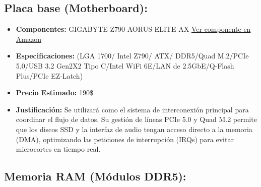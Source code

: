 \documentclass[12pt,a4paper]{article}
\begin{document}
\subsection{Placa base (Motherboard):}

\begin{itemize}
    \item \textbf{Componentes:} GIGABYTE Z790 AORUS ELITE AX 
    \href{https://www.amazon.com/-/es/GIGABYTE-Z790-AX-Q-Flash-EZ-Latch/dp/B0BH9DXY38/ref=sr_1_1?__mk_es_US=%C3%85M%C3%85%C5%BD%C3%95%C3%91&crid=2HDATKJYEV36G&dib=eyJ2IjoiMSJ9.dHJ2hc306MKX1EWBqwtBPY04knKXazo2OL0_nY9YKt6TeaEGxRyV1Iv5Rf3Ojn8Hlgvw2UzWWLM2GDNSdQWD7AsaQ-dwEoHlWpzwyc_NKo3gw_Z4EUFMh0hP0EMExHeCnIEZoSPhVPgb2sIG8jSRmheZV7ZBU4K9DsM-qQbgFxqFRHVrODQ6U9gYlDx3WBQQfMKL9oKMKjVwOD3glCbTjcbaOM6rYwKKdCnSX2iSzfQ.-kxUCIsFUDGV9O-CS34PvWimtieduNzCe5p3V095QHo&dib_tag=se&keywords=Chipset%2BIntel%2BZ790%2B(Socket%2BLGA1700).%2F%2BSoporte%2Bpara%2Bmemoria%2BRAM%2BDDR5%2Ben%2Bdoble%2Bcanal%2B(Dual%2BChannel).%2F%2B5%2Branuras%2Bpara%2Balmacenamiento%2BSSD%2BM.2%2B(compatibles%2Bcon%2BPCIe%2B5.0%2By%2B4.0).%2F%2BPuertos%2Btraseros%2BUSB-C%2Bde%2Balta%2Bvelocidad%2By%2Bcompatibilidad%2Bcon%2Btarjetas%2Bde%2Bexpansi%C2%B4on%2BThunderbolt%2B4.&nsdOptOutParam=true&qid=1779421296&sprefix=chipset%2Bintel%2Bz790%2Bsocket%2Blga1700%2B.%2F%2Bsoporte%2Bpara%2Bmemoria%2Bram%2Bddr5%2Ben%2Bdoble%2Bcanal%2Bdual%2Bchannel%2B.%2F%2B5%2Branuras%2Bpara%2Balmacenamiento%2Bssd%2Bm.2%2Bcompatibles%2Bcon%2Bpcie%2B5.0%2By%2B4.0%2B.%2F%2Bpuertos%2Btraseros%2Busb-c%2Bde%2Balta%2Bvelocidad%2By%2Bcompatibilidad%2Bcon%2Btarjetas%2Bde%2Bexpansi%2Bon%2Bthunderbolt%2B4.%2Caps%2C440&sr=8-1&th=1}{Ver componente en Amazon}
    \item \textbf{Especificaciones:} (LGA 1700/ Intel Z790/ ATX/ DDR5/Quad M.2/PCIe 5.0/USB 3.2 Gen2X2 Tipo C/Intel WiFi 6E/LAN de 2.5GbE/Q-Flash Plus/PCIe EZ-Latch)
    \item \textbf{Precio Estimado:} 190\$
    \item \textbf{Justificación:} Se utilizará como el sistema de interconexión principal para coordinar el flujo de datos. Su gestión de líneas PCIe 5.0 y Quad M.2 permite que los discos SSD y la interfaz de audio tengan acceso directo a la memoria (DMA), optimizando las peticiones de interrupción (IRQs) para evitar microcortes en tiempo real.
\end{itemize}



\subsection{Memoria RAM (Módulos DDR5):}
\end{document}
